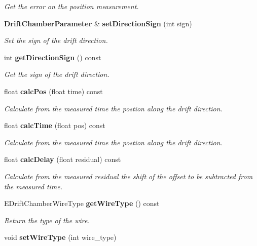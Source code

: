 \begin{DoxyCompactItemize}
\begin{DoxyCompactList}\small\item\em Get the error on the position measurement. \item\end{DoxyCompactList}\item 
{\bf DriftChamberParameter} \& {\bf setDirectionSign} (int sign)\label{classCALICE_1_1DriftChamberParameter_afd5956ba2128c0f666c64122f15d9d4b}

\begin{DoxyCompactList}\small\item\em Set the sign of the drift direction. \item\end{DoxyCompactList}\item 
int {\bf getDirectionSign} () const \label{classCALICE_1_1DriftChamberParameter_a8ac5b85049c531796b2f2f06ad011639}

\begin{DoxyCompactList}\small\item\em Get the sign of the drift direction. \item\end{DoxyCompactList}\item 
float {\bf calcPos} (float time) const 
\begin{DoxyCompactList}\small\item\em Calculate from the measured time the postion along the drift direction. \item\end{DoxyCompactList}\item 
float {\bf calcTime} (float pos) const 
\begin{DoxyCompactList}\small\item\em Calculate from the measured time the postion along the drift direction. \item\end{DoxyCompactList}\item 
float {\bf calcDelay} (float residual) const 
\begin{DoxyCompactList}\small\item\em Calculate from the measured residual the shift of the offset to be subtracted from the measured time. \item\end{DoxyCompactList}\item 
EDriftChamberWireType {\bf getWireType} () const 
\begin{DoxyCompactList}\small\item\em Return the type of the wire. \item\end{DoxyCompactList}\item 
void {\bf setWireType} (int wire\_\-type)\label{classCALICE_1_1DriftChamberParameter_a9de6a8d30fab8e57684d3a7d0f00165a}


\end{DoxyCompactItemize}
